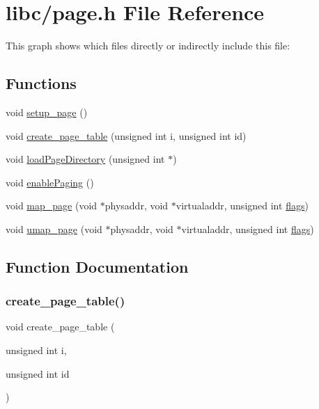 \hypertarget{a00086}{}\section{libc/page.h File Reference}
\label{a00086}
This graph shows which files directly or indirectly include this file\+:
\subsection*{Functions}
\begin{DoxyCompactItemize}
\item 
void \hyperlink{a00086_a51f6a37816540dea572d38f2713e9f5a_a51f6a37816540dea572d38f2713e9f5a}{setup\+\_\+page} ()
\item 
void \hyperlink{a00086_a7bb2c9b4c69002e17903710ce4de395c_a7bb2c9b4c69002e17903710ce4de395c}{create\+\_\+page\+\_\+table} (unsigned int i, unsigned int id)
\item 
void \hyperlink{a00086_abfdf37b9c42cafa83b39f1a41264989c_abfdf37b9c42cafa83b39f1a41264989c}{load\+Page\+Directory} (unsigned int $\ast$)
\item 
void \hyperlink{a00086_a8fe3a9cca4b2ccd7a2743e9943880a32_a8fe3a9cca4b2ccd7a2743e9943880a32}{enable\+Paging} ()
\item 
void \hyperlink{a00086_adf8c9211327b122b455fabf292cc2411_adf8c9211327b122b455fabf292cc2411}{map\+\_\+page} (void $\ast$physaddr, void $\ast$virtualaddr, unsigned int \hyperlink{a00074_aa2585d779da0ab21273a8d92de9a0ebe_aa2585d779da0ab21273a8d92de9a0ebe}{flags})
\item 
void \hyperlink{a00086_a5a808805c707701e7fb8816d51896fb5_a5a808805c707701e7fb8816d51896fb5}{umap\+\_\+page} (void $\ast$physaddr, void $\ast$virtualaddr, unsigned int \hyperlink{a00074_aa2585d779da0ab21273a8d92de9a0ebe_aa2585d779da0ab21273a8d92de9a0ebe}{flags})
\end{DoxyCompactItemize}


\subsection{Function Documentation}
\mbox{\label{a00086_a7bb2c9b4c69002e17903710ce4de395c_a7bb2c9b4c69002e17903710ce4de395c}} 
\subsubsection{\texorpdfstring{create\+\_\+page\+\_\+table()}{create\_page\_table()}}
{\footnotesize\ttfamily void create\+\_\+page\+\_\+table (\begin{DoxyParamCaption}\item[{unsigned int}]{i,  }\item[{unsigned int}]{id }\end{DoxyParamCaption})}



